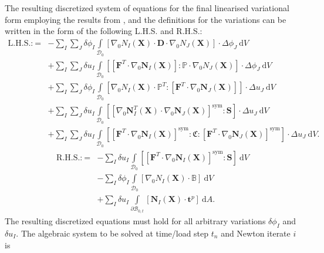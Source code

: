 \documentclass[11pt,a4paper,final]{article}
\begin{document}
The resulting discretized system of equations for the final linearised variational form  employing the results from ,  and the definitions for the variations  can be written in the form of the following L.H.S. and R.H.S.:
\begin{align}
\text{L.H.S.:} \ = &- \sum\limits_I \sum\limits_J \delta \phi_I \int\limits_{\mathcal{D}_0} \left[ \nabla_0 N_I (\mathbf{X}) \cdot \mathbf{D} \cdot \nabla_0 N_J (\mathbf{X}) \right] \cdot \Delta \phi_J \ \mathrm{d}V \nonumber \\
&+ \sum\limits_I \sum\limits_J \delta u_I \int\limits_{\mathcal{D}_0} \left[ \left[ \mathbf{F}^T \cdot \nabla_0 \mathbf{N}_I (\mathbf{X}) \right] : \mathbb{P} \cdot \nabla_0 N_J (\mathbf{X}) \right] \cdot \Delta \phi_J \ \mathrm{d}V \nonumber \\
&+ \sum\limits_I \sum\limits_J \delta \phi_I \int\limits_{\mathcal{D}_0} \left[ \nabla_0 N_I (\mathbf{X}) \cdot \mathbb{P}^T : \left[ \mathbf{F}^T \cdot \nabla_0 \mathbf{N}_J (\mathbf{X}) \right] \right] \cdot \Delta u_J \ \mathrm{d}V \nonumber \\
&+ \sum\limits_I \sum\limits_J \delta u_I \int\limits_{\mathcal{D}_0} \left[ \left[ \nabla_0 \mathbf{N}_I^T (\mathbf{X}) \cdot \nabla_0 \mathbf{N}_J (\mathbf{X}) \right]^{\text{sym}} : \mathbf{S} \right] \cdot \Delta u_J \ \mathrm{d}V \nonumber \\
&+ \sum\limits_I \sum\limits_J \delta u_I \int\limits_{\mathcal{D}_0} \left[ \left[ \mathbf{F}^T \cdot \nabla_0 \mathbf{N}_I (\mathbf{X}) \right]^{\text{sym}} : \mathfrak{C} : \left[ \mathbf{F}^T \cdot \nabla_0 \mathbf{N}_J (\mathbf{X}) \right]^{\text{sym}} \right] \cdot \Delta u_J \ \mathrm{d}V.
\label{eq:3.36}
\end{align}
\begin{align}
\text{R.H.S.:} \ = &- \sum\limits_I \delta u_I \int\limits_{\mathcal{D}_0} \left[ \left[ \mathbf{F}^T \cdot \nabla_0 \mathbf{N}_I (\mathbf{X}) \right]^{\text{sym}} : \mathbf{S} \right] \ \mathrm{d}V \nonumber \\
&- \sum\limits_I \delta \phi_I \int\limits_{\mathcal{D}_0} \left[ \nabla_0 N_I (\mathbf{X}) \cdot \mathbb{B} \right] \ \mathrm{d}V \nonumber \\
&+ \sum\limits_I \delta u_I \int\limits_{\partial \mathcal{B}_{0,t}} \left[ \mathbf{N}_I (\mathbf{X}) \cdot \mathbf{t}^p \right] \ \mathrm{d}A.
\label{eq:3.37}
\end{align}
The resulting discretized equations  must hold for all arbitrary variations $\delta \phi_I$ and $\delta u_I$. The algebraic system to be solved at time/load step $t_n$ and Newton iterate $i$ is
\end{document}
